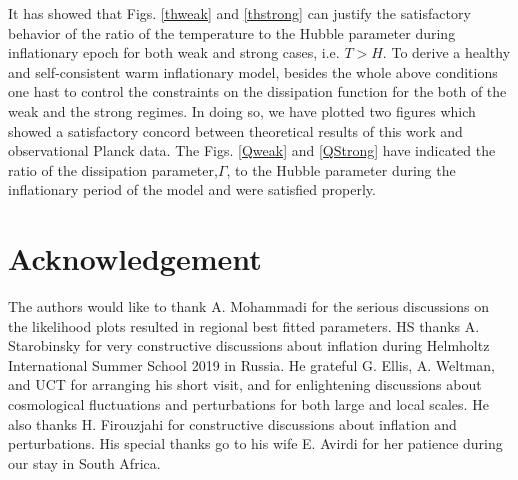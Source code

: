 \documentclass[12pt]{revtex4}
\begin{document}
{It has showed that Figs. \ref{thweak} and  \ref{thstrong} can  justify the satisfactory behavior of the ratio of the temperature to the Hubble parameter during inflationary epoch for both weak and strong cases, i.e. $T>H$.}
{To derive a healthy and self-consistent  warm inflationary model, besides the whole above conditions one hast to control the constraints on the dissipation function for the both of the weak and the strong regimes. In doing so, we have plotted two figures which showed a satisfactory concord between theoretical results of this work and observational Planck data. The Figs. \ref{Qweak} and \ref{QStrong} have indicated the ratio of the dissipation parameter,$\Gamma$, to the Hubble parameter during the inflationary period of the  model  and were satisfied properly.}

\section{Acknowledgement}
The authors would like to thank A. Mohammadi for the serious discussions on the likelihood plots resulted in regional best fitted parameters. HS thanks A. Starobinsky for very constructive discussions about inflation during Helmholtz International Summer School  2019 in Russia. He grateful G. Ellis, A. Weltman, and UCT for arranging his short visit, and for enlightening discussions about cosmological fluctuations and perturbations for both large and local scales. He also thanks  H. Firouzjahi for constructive discussions about inflation and perturbations. His special thanks go to his wife E. Avirdi for her patience during our stay in South Africa.
\end{document}
